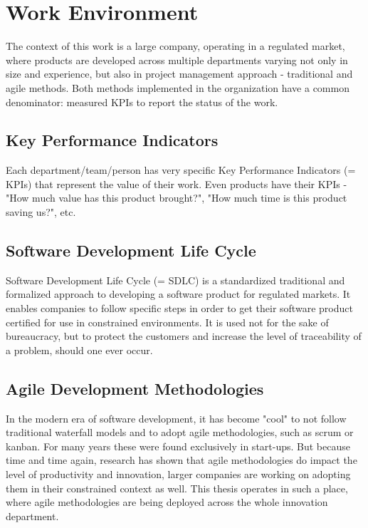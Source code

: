\newpage

\section{Work Environment}

The context of this work is a large company, operating in a regulated market, where products are developed across multiple departments varying not only in size and experience, but also in project management approach - traditional and agile methods. Both methods implemented in the organization have a common denominator: measured KPIs to report the status of the work.

\subsection{Key Performance Indicators}

Each department/team/person has very specific Key Performance Indicators (= KPIs) that represent the value of their work. Even products have their KPIs - "How much value has this product brought?", "How much time is this product saving us?", etc.

\subsection{Software Development Life Cycle}

Software Development Life Cycle (= SDLC) is a standardized traditional and formalized approach to developing a software product for regulated markets. It enables companies to follow specific steps in order to get their software product certified for use in constrained environments. It is used not for the sake of bureaucracy, but to protect the customers and increase the level of traceability of a problem, should one ever occur.

\subsection{Agile Development Methodologies}

In the modern era of software development, it has become "cool" to not follow traditional waterfall models and to adopt agile methodologies, such as scrum or kanban. For many years these were found exclusively in start-ups. But because time and time again, research \cite{947100} has shown that agile methodologies do impact the level of productivity and innovation, larger companies are working on adopting them in their constrained context as well. This thesis operates in such a place, where agile methodologies are being deployed across the whole innovation department.

